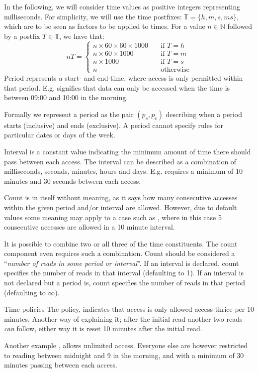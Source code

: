 In the following, we will consider time values as positive integers representing milliseconds.
For simplicity, we will use the time postfixes: $\mathbb{T} = \{ h, m, s, ms \}$, which are to be seen as factors to be applied to times.
For a value $n \in \mathbb{N}$ followed by a postfix $T \in \mathbb{T}$, we have that:
\[nT = \begin{cases}
  n \times 60 \times 60 \times 1000 & \quad\text{if } T = h \\
  n \times 60 \times 1000 & \quad\text{if } T = m \\
  n \times 1000 & \quad\text{if } T = s \\
  n & \quad\text{otherwise}
\end{cases}\]
Period represents a start- and end-time, where access is only permitted within that period.
E.g.  signifies that data can only be accessed when the time is between 09:00 and 10:00 in the morning.

Formally we represent a period as the pair $(p_s, p_e)$ describing when a period starts (inclusive) and ends (exclusive).
A period cannot specify rules for particular dates or days of the week.

Interval is a constant value indicating the minimum amount of time there should pass between each access.
The interval can be described as a combination of milliseconds, seconds, minutes, hours and days.
E.g.  requires a minimum of 10 minutes and 30 seconds between each access.

Count is in itself without meaning, as it says how many consecutive accesses within the given period and/or interval are allowed.
However, due to default values some meaning may apply to a case such as , where in this case 5 consecutive accesses are allowed in a 10 minute interval.

It is possible to combine two or all three of the time constituents.
The count component even requires such a combination.
Count should be considered a ``\textit{number of reads in some period or interval}''.
If an interval is declared, count specifies the number of reads in that interval (defaulting to 1).
If an interval is not declared but a period is, count specifies the number of reads in that period (defaulting to $\infty$).

\begin{example}{Time policies}
  The  policy, indicates that access is only allowed access thrice per 10 minutes.
  Another way of explaining it; after the initial read another two reads \emph{can} follow, either way it is reset 10 minutes after the initial read.

  Another example , allows  unlimited access.
  Everyone else are however restricted to reading between midnight and 9 in the morning, and with a minimum of 30 minutes passing between each access.
\end{example}

